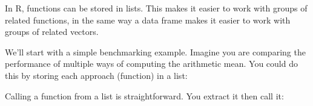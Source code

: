 
In R, functions can be stored in lists. This makes it easier to work
with groups of related functions, in the same way a data frame makes it
easier to work with groups of related vectors.

We'll start with a simple benchmarking example. Imagine you are
comparing the performance of multiple ways of computing the arithmetic
mean. You could do this by storing each approach (function) in a list:

\begin{Shaded}
\begin{Highlighting}[]
\StringTok{ }\NormalTok{(}
   
   \StringTok{ }
   
    \StringTok{ }
    \StringTok{ }
      \StringTok{ }\StringTok{ }\StringTok{ }
    \NormalTok{\}}
  \NormalTok{\}}
\NormalTok{)}
\end{Highlighting}
\end{Shaded}

Calling a function from a list is straightforward. You extract it then
call it:

\begin{Shaded}
\begin{Highlighting}[]
\StringTok{ }\NormalTok{(}\NormalTok{)}
\NormalTok{(compute_mean[[}\NormalTok{]](x))}
\NormalTok{(compute_mean[[}\NormalTok{]](x))}
\end{Highlighting}
\end{Shaded}

